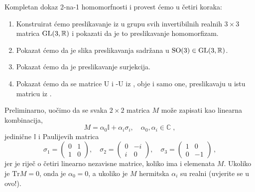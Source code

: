 Kompletan dokaz 2-na-1 homomorfnosti  i  provest ćemo
u četiri koraka:
\begin{enumerate}
    \item Konstruirat ćemo preslikavanje iz  u grupu svih invertibilnih realnih
        $3\times 3$ matrica $\mathrm{GL}(3, \mathbb{R})$ i pokazati da je to preslikavanje homomorfizam.
    \item Pokazat ćemo da je slika preslikavanja sadržana u $\mathrm{SO}(3) \in \mathrm{GL}(3, \mathbb{R})$.
    \item Pokazat ćemo da je preslikavanje surjekcija.
    \item Pokazat ćemo da se matrice U i -U iz , obje i samo one, preslikavaju u 
        istu matricu iz .
\end{enumerate}
Preliminarno, uočimo da se svaka $2\times 2$ matrica $M$ može zapisati kao linearna
kombinacija,
\begin{equation}
M = \alpha_0 \mathbb{I} + \alpha_i \sigma_i, \quad \alpha_0, \alpha_i \in \mathbb{C}\;,
\end{equation}
jedinične $\mathbb{I}$ i Paulijevih matrica
\begin{equation}
\sigma_1 = \begin{pmatrix} 0 & 1 \\ 1 & 0 \end{pmatrix}, \quad
\sigma_2 = \begin{pmatrix} 0 & -i \\ i & 0 \end{pmatrix}, \quad
\sigma_3 = \begin{pmatrix} 1 & 0 \\ 0 & -1 \end{pmatrix}\,,
\label{eq:paulijevematrice}
\end{equation}
jer je riječ o četiri linearno nezavisne matrice, koliko ima i elemenata $M$.
Ukoliko je $\mathrm{Tr} M = 0$,
onda je $\alpha_0 = 0$, a ukoliko je $M$ hermitska $\alpha_i$ su realni
(uvjerite se u ovo!).

